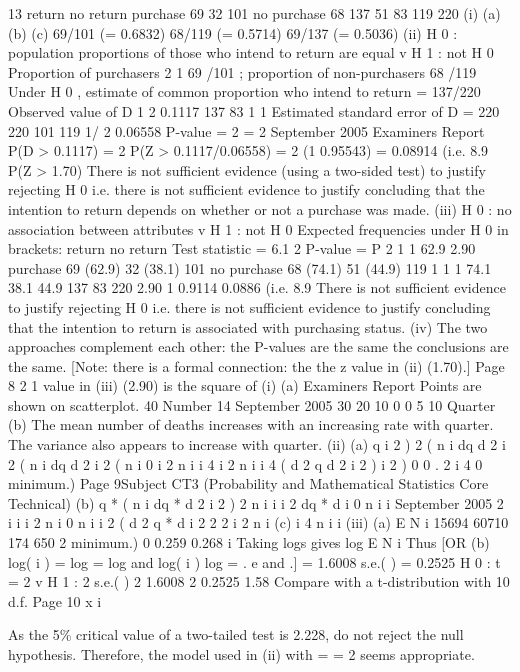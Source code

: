 \documentclass[a4paper,12pt]{article}
\begin{document}
13
return
no return
purchase
69
32
101
no purchase
68
137
51
83
119
220
(i) (a)
(b)
(c)
69/101 (= 0.6832)
68/119 (= 0.5714)
69/137 (= 0.5036)
(ii) H 0 : population proportions of those who intend to return are equal
v H 1 : not H 0
Proportion of purchasers
2
1
69 /101 ; proportion of non-purchasers
68 /119
Under H 0 , estimate of common proportion who intend to return = 137/220
Observed value of D
1
2
0.1117
137 83 1
1
Estimated standard error of D =
220 220 101 119
1/ 2
0.06558
P-value = 2
= 2
September 2005
Examiners Report
P(D > 0.1117) = 2 P(Z > 0.1117/0.06558) = 2
(1 0.95543) = 0.08914 (i.e. 8.9%
P(Z > 1.70)
There is not sufficient evidence (using a two-sided test) to justify rejecting H 0 i.e. there is not sufficient evidence to justify concluding that the intention to return depends on whether or not a purchase was made.
(iii)
H 0 : no association between attributes v H 1 : not H 0
Expected frequencies under H 0 in brackets:
return
no return
Test statistic = 6.1 2
P-value = P
2
1
1
62.9
2.90
purchase
69 (62.9)
32 (38.1)
101
no purchase
68 (74.1)
51 (44.9)
119
1
1
1
74.1 38.1 44.9
137
83
220
2.90
1 0.9114 0.0886 (i.e. 8.9%
There is not sufficient evidence to justify rejecting H 0 i.e. there is not sufficient evidence to justify concluding that the intention to return is associated with purchasing status.
(iv)
The two approaches complement each other:
the P-values are the same
the conclusions are the same.
[Note: there is a formal connection: the
the z value in (ii) (1.70).]
Page 8
2
1 value
in (iii) (2.90) is the square of
(i)
(a)
Examiners Report
Points are shown on scatterplot.
40
Number
14
September 2005
30
20
10
0
0
5
10
Quarter
(b)
The mean number of deaths increases with an increasing rate with
quarter.
The variance also appears to increase with quarter.
(ii)
(a)
q
i 2 ) 2
( n i
dq
d
2 i 2 ( n i
dq
d
2 i 2 ( n i
0
i 2 n i
i 4
i 2 n i
i 4
(
d 2 q
d
2
i 2 )
i 2 ) 0
0
.
2 i 4
0
minimum.)
Page 9Subject CT3 (Probability and Mathematical Statistics Core Technical)
(b)
q * ( n i
dq *
d 2
i 2 ) 2
n i
i
i 2
dq *
d
i
0
n i
i
September 2005
2
i
i
i 2
n i
0
n i
i 2
(
d 2 q *
d
i 2
2
2
i 2 n i
(c)
i
4
n i
i
(iii)
(a)
E N i
15694
60710
174
650
2
minimum.)
0
0.259
0.268
i
Taking logs gives
log E N i
Thus
[OR
(b)
log( i ) = log
= log and
log( i ) log
= .
e and
.]
= 1.6008 s.e.( ) = 0.2525
H 0 :
t
= 2 v H 1 :
2
s.e.( )
2
1.6008 2
0.2525
1.58
Compare with a t-distribution with 10 d.f.
Page 10
x i

As the 5\% critical value of a two-tailed test is 2.228, do not reject the null hypothesis.
Therefore, the model used in (ii) with
=
= 2 seems appropriate.
\end{document}
